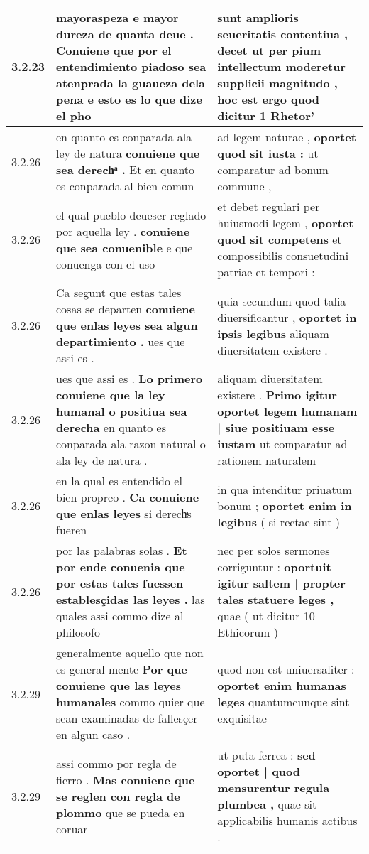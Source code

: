 \begin{tabular}{|p{1cm}|p{6.5cm}|p{6.5cm}|}
3.2.23 & mayoraspeza e mayor dureza de quanta deue . \textbf{ Conuiene que por el entendimiento piadoso sea atenprada la guaueza dela pena } e esto es lo que dize el pho & sunt amplioris seueritatis contentiua , \textbf{ decet ut per pium intellectum moderetur supplicii magnitudo , } hoc est ergo quod dicitur 1 Rhetor’ \\\hline
3.2.26 & en quanto es conparada ala ley de natura \textbf{ conuiene que sea derechͣ . } Et en quanto es conparada al bien comun & ad legem naturae , \textbf{ oportet quod sit iusta : } ut comparatur ad bonum commune , \\\hline
3.2.26 & el qual pueblo deueser reglado por aquella ley . \textbf{ conuiene que sea conuenible } e que conuenga con el uso & et debet regulari per huiusmodi legem , \textbf{ oportet quod sit competens } et compossibilis consuetudini patriae et tempori : \\\hline
3.2.26 & Ca segunt que estas tales cosas se departen \textbf{ conuiene que enlas leyes sea algun departimiento . } ues que assi es . & quia secundum quod talia diuersificantur , \textbf{ oportet in ipsis legibus } aliquam diuersitatem existere . \\\hline
3.2.26 & ues que assi es . \textbf{ Lo primero conuiene que la ley humanal o positiua sea derecha } en quanto es conparada ala razon natural o ala ley de natura . & aliquam diuersitatem existere . \textbf{ Primo igitur oportet legem humanam | siue positiuam esse iustam } ut comparatur ad rationem naturalem \\\hline
3.2.26 & en la qual es entendido el bien propreo . \textbf{ Ca conuiene que enlas leyes } si derechͣs fueren & in qua intenditur priuatum bonum ; \textbf{ oportet enim in legibus } ( si rectae sint ) \\\hline
3.2.26 & por las palabras solas . \textbf{ Et por ende conuenia que por estas tales fuessen establesçidas las leyes . } las quales assi commo dize al philosofo & nec per solos sermones corriguntur : \textbf{ oportuit igitur saltem | propter tales statuere leges , } quae ( ut dicitur 10 Ethicorum ) \\\hline
3.2.29 & generalmente aquello que non es general mente \textbf{ Por que conuiene que las leyes humanales } commo quier que sean examinadas de fallesçer en algun caso . & quod non est uniuersaliter : \textbf{ oportet enim humanas leges } quantumcunque sint exquisitae \\\hline
3.2.29 & assi commo por regla de fierro . \textbf{ Mas conuiene que se reglen con regla de plommo } que se pueda en coruar & ut puta ferrea : \textbf{ sed oportet | quod mensurentur regula plumbea , } quae sit applicabilis humanis actibus . \\\hline

\end{tabular}
